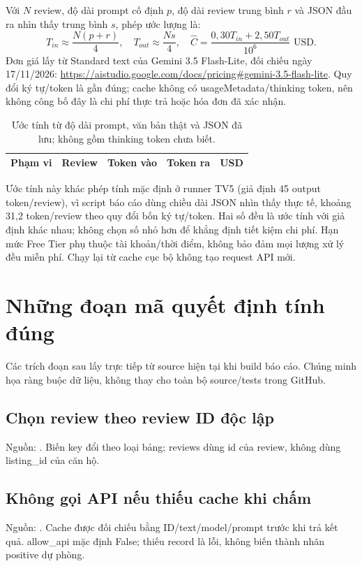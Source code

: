 \documentclass[11pt,a4paper]{article}
\begin{document}
Với $N$ review, độ dài prompt cố định $p$, độ dài review trung bình $r$ và JSON đầu ra nhìn thấy trung bình $s$, phép ước lượng là:
\[
T_{in}\approx\frac{N(p+r)}{4},\quad T_{out}\approx\frac{Ns}{4},\quad
\widehat{C}=\frac{0,30T_{in}+2,50T_{out}}{10^6}\text{ USD}.
\]
Đơn giá lấy từ Standard text của Gemini 3.5 Flash-Lite, đối chiếu ngày 17/11/2026: \url{https://aistudio.google.com/docs/pricing#gemini-3.5-flash-lite}. Quy đổi ký tự/token là gần đúng; cache không có usageMetadata/thinking token, nên không công bố đây là chi phí thực trả hoặc hóa đơn đã xác nhận.

\begin{table}[htbp]\centering\small
\caption{Ước tính từ độ dài prompt, văn bản thật và JSON đã lưu; không gồm thinking token chưa biết.}
\begin{tabularx}{\linewidth}{@{}Yrrrr@{}}\toprule
Phạm vi & Review & Token vào & Token ra & USD\\\midrule

\end{tabularx}
\end{table}

Ước tính này khác phép tính mặc định ở runner TV5 (giả định 45 output token/review), vì script báo cáo dùng chiều dài JSON nhìn thấy thực tế, khoảng 31,2 token/review theo quy đổi bốn ký tự/token. Hai số đều là ước tính với giả định khác nhau; không chọn số nhỏ hơn để khẳng định tiết kiệm chi phí. Hạn mức Free Tier phụ thuộc tài khoản/thời điểm, không bảo đảm mọi lượng xử lý đều miễn phí. Chạy lại từ cache cục bộ không tạo request API mới.

\section{Những đoạn mã quyết định tính đúng}
Các trích đoạn sau lấy trực tiếp từ source hiện tại khi build báo cáo. Chúng minh họa ràng buộc dữ liệu, không thay cho toàn bộ source/tests trong GitHub.

\subsection{Chọn review theo review ID độc lập}
\noindent Nguồn: . Biến key đổi theo loại bảng; reviews dùng id của review, không dùng listing\_id của căn hộ.

\subsection{Không gọi API nếu thiếu cache khi chấm}
\noindent Nguồn: . Cache được đối chiếu bằng ID/text/model/prompt trước khi trả kết quả. allow\_api mặc định False; thiếu record là lỗi, không biến thành nhãn positive dự phòng.
\end{document}
